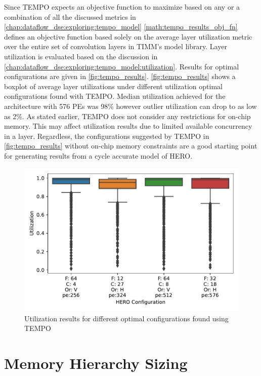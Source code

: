 Since TEMPO expects an objective function to maximize based on any or a
combination of all the discussed metrics in
\autoref{chap:dataflow_dse:exploring:tempo_model}
\autoref{math:tempo_results_obj_fn} defines an objective function based solely
on the average layer utilization metric over the entire set of convolution
layers in TIMM's model library. Layer utilization is evaluated based on the
discussion in \autoref{chap:dataflow_dse:exploring:tempo_model:utilization}.
Results for optimal configurations are given in \autoref{fig:tempo_results}.
\autoref{fig:tempo_results} shows a boxplot of average layer utilizations under
different utilization optimal configurations found with TEMPO. Median
utilization achieved for the architecture with 576 PEs was 98\% however outlier
utilization can drop to as low as 2\%. As stated earlier, TEMPO does not
consider any restrictions for on-chip memory. This may affect utilization
results due to limited available concurrency in a layer. Regardless, the
configurations suggested by TEMPO in \autoref{fig:tempo_results} without on-chip
memory constraints are a good starting point for generating results from a cycle
accurate model of HERO.


\begin{figure}[]
    \centering
    \includegraphics[scale=0.7]{Plots/tempo.pdf}
    \caption{Utilization results for different optimal configurations found using TEMPO}
    \label{fig:tempo_results}
\end{figure}


\section{Memory Hierarchy Sizing}
\label{chap:dataflow_dse:memory_hierarchy_sizing}

